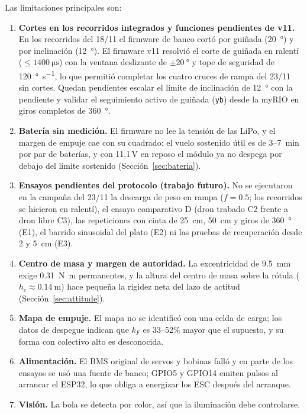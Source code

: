 Las limitaciones principales son:
\begin{enumerate}[label=(\roman*)]
  \item \textbf{Cortes en los recorridos integrados y funciones pendientes de v11.} En los recorridos del 18/11 el firmware de banco cortó por guiñada (\SI{20}{\degree}) y por inclinación (\SI{12}{\degree}). El firmware v11 resolvió el corte de guiñada en ralentí ($\le\SI{1400}{\micro\second}$) con la ventana deslizante de $\pm\SI{20}{\degree}$ y tope de seguridad de \SI{120}{\degree\per\second}, lo que permitió completar los cuatro cruces de rampa del 23/11 sin cortes. Quedan pendientes escalar el límite de inclinación de \SI{12}{\degree} con la pendiente y validar el seguimiento activo de guiñada (\texttt{yb}) desde la myRIO en giros completos de \SI{360}{\degree}.
  \item \textbf{Batería sin medición.} El firmware no lee la tensión de las LiPo, y el margen de empuje cae con su cuadrado: el vuelo sostenido útil es de 3--\SI{7}{\minute} por par de baterías, y con 11,1\,V en reposo el módulo ya no despega por debajo del límite sostenido (Sección~\ref{sec:bateria}).
  \item \textbf{Ensayos pendientes del protocolo (trabajo futuro).} No se ejecutaron en la campaña del 23/11 la descarga de peso en rampa ($f=0.5$; los recorridos se hicieron en ralentí), el ensayo comparativo D (dron trabado C2 frente a dron libre C3), las repeticiones con cinta de \SI{25}{\centi\metre}, \SI{50}{\centi\metre} y giros de \SI{360}{\degree} (E1), el barrido sinusoidal del plato (E2) ni las pruebas de recuperación desde 2 y \SI{5}{\centi\metre} (E3).
  \item \textbf{Centro de masa y margen de autoridad.} La excentricidad de \SI{9.5}{\milli\metre} exige \SI{0.31}{\newton\metre} permanentes, y la altura del centro de masa sobre la rótula ($h_c\approx\SI{0.14}{\metre}$) hace pequeña la rigidez neta del lazo de actitud (Sección~\ref{sec:attitude}).
  \item \textbf{Mapa de empuje.} El mapa no se identificó con una celda de carga; los datos de despegue indican que $k_F$ es 33--52\% mayor que el supuesto, y su forma con colectivo alto es desconocida.
  \item \textbf{Alimentación.} El BMS original de servos y bobinas falló y en parte de los ensayos se usó una fuente de banco; GPIO5 y GPIO14 emiten pulsos al arrancar el ESP32, lo que obliga a energizar los ESC después del arranque.
  \item \textbf{Visión.} La bola se detecta por color, así que la iluminación debe controlarse.

\end{enumerate}
